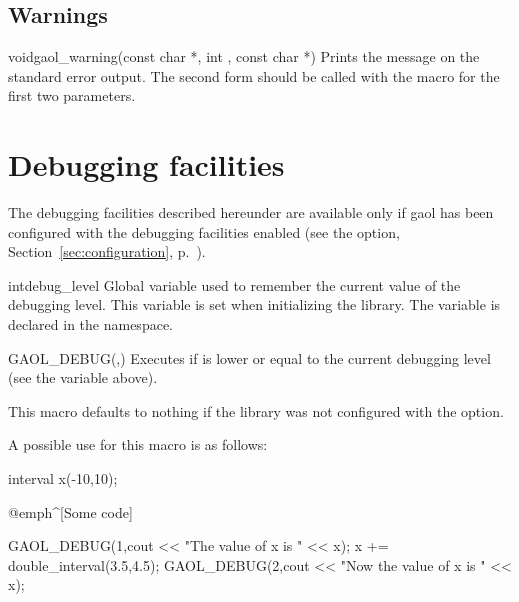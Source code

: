 \documentclass{manual}
\begin{document}
\section{Warnings}

\begin{deffun}{void}{gaol\_warning}{(const char *, int , const char *)}
Prints the message  on the standard error output. The second form
should be called with the  macro for the first two parameters.
\end{deffun}

\chapter{Debugging facilities}\label{sec:debugging-facilities}

The debugging facilities described hereunder are available only if
gaol has been configured with the debugging facilities enabled (see
the  option, Section~\ref{sec:configuration},
p.~\pageref{sec:configuration}).

\begin{deffun}{int}{debug\_level}{}
  Global variable used to remember the current value of the debugging
  level.  This variable is set when initializing the library. The
  variable is declared in the  namespace.
\end{deffun}

\begin{defmacroA}{GAOL\_DEBUG}{(,)}
  Executes  if  is lower or equal to the current debugging
  level (see the variable  above).

  This macro defaults to nothing if the library was not configured with the
 option.
\end{defmacroA}

\noindent
A possible use for this macro is as follows:

\begin{example}
interval x(-10,10);

@emph^[Some code]~

GAOL_DEBUG(1,cout << "The value of x is " << x);
x += double_interval(3.5,4.5);
GAOL_DEBUG(2,cout << "Now the value of x is " << x);
\end{example}
\end{document}
